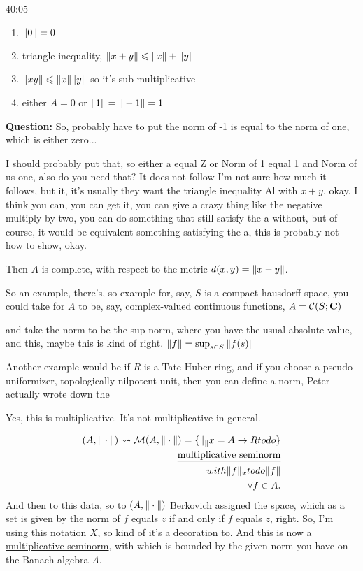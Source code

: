 \begin{example}
\begin{unfinished}{40:05}
\begin{enumerate}
\item $\| 0 \| = 0$
\item triangle inequality, $\| x + y \| \leqslant \| x \| + \| y \|$
\item $\| xy \| \leqslant \| x \| \| y \|$ so it's sub-multiplicative
\item either $A = 0$ or $\| 1 \| = \| -1 \| = 1$
\end{enumerate}

\textbf{Question:} So, probably have to put the norm of -1 is equal to the norm of one, which is either zero...

 I should probably put that, so either a equal Z or Norm of 1 equal 1 and Norm of us one, also do you need that? It does not follow I'm not sure how much it follows, but it, it's usually they want the triangle inequality Al with $x + y$, okay. I think you can, you can get it, you can give a crazy thing like the negative multiply by two, you can do something that still satisfy the a without, but of course, it would be equivalent something satisfying the a, this is probably not how to show, okay.

Then $A$ is complete, with respect to the metric $d(x,y) = \| x-y \|$. 

\begin{example}
So an example, there's, so example for, say, $S$ is a compact hausdorff space, you could take for $A$ to be, say, complex-valued continuous functions,
$A = \mathcal{C}(S; \mathbf C)$

and take the norm to be the sup norm, where you have the usual absolute value, and this, maybe this is kind of right. 
$\| f \| = \sup_{s \in S} \| f(s) \|$

\end{example}
 
\begin{example} 
 Another example would be if $R$ is a Tate-Huber ring, and if you choose a pseudo uniformizer, topologically nilpotent unit, then you can define a norm, Peter actually wrote down the
\end{example}

Yes, this is multiplicative. It's not multiplicative in general.

\begin{align*}
(A, \| \cdot \|) \leadsto \mathcal{M}(A, \| \cdot \|) = \{ \| _ \|{x} = A \to R todo \} \\
\text{\underline{multiplicative seminorm}} \\
with \| f \|_x todo \| f \| \\
\forall f \in A.
\end{align*}
And then to this data, so to $(A, \| \cdot \|)$ Berkovich assigned the space, which as a set is given by the norm of $f$ equals $z$ if and only if $f$ equals $z$, right.
So, I'm using this notation $X$, so kind of it's a decoration to. And this is now a \underline{multiplicative seminorm}, with which is bounded by the given norm you have on the Banach algebra $A$.


\end{unfinished}
\end{example}
